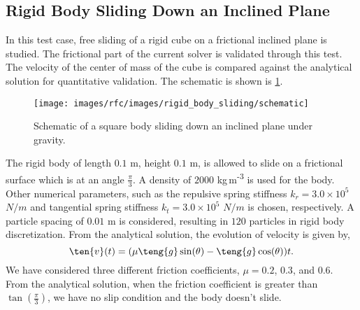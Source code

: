 \FloatBarrier%
\subsection{Rigid Body Sliding Down an Inclined Plane}
\label{sec:rigid-body-sliding}
In this test case, free sliding of a rigid cube on a frictional inclined plane
is studied. The frictional part of the current solver is validated through this
test. The velocity of the center of mass of the cube is compared against the
analytical solution for quantitative validation. The schematic is shown is
\cref{fig:rigid_body_sliding}.
\begin{figure}[!htpb]
  \centering
  \texttt{[image: images/rfc/images/rigid\_body\_sliding/schematic]}
  \caption{Schematic of a square body sliding down an inclined plane under gravity.}
\label{fig:rigid_body_sliding}
\end{figure}
The rigid body of length $0.1$ m, height $0.1$ m, is allowed to slide on a
frictional surface which is at an angle $\frac{\pi}{3}$. A density of $2000$
kg\,m\textsuperscript{-3} is used for the body. Other numerical parameters, such
as the repulsive spring stiffness $k_r=3.0 \times 10^{5}$ $N/m$ and tangential
spring stiffness $k_t=3.0 \times 10^{5}$ $N/m$ is chosen, respectively. A
particle spacing of $0.01$ m is considered, resulting in $120$ particles in
rigid body discretization. From the analytical solution, the evolution of
velocity is given by,
\begin{equation}
  \label{eq:rfc:ce}
  \ten{v}(t) = (\mu \teng{g} \sin (\theta) - \teng{g} \cos (\theta)) t.
\end{equation}
We have considered three different friction coefficients, $\mu=0.2$,
$0.3$, and $0.6$. From the analytical solution, when the friction
coefficient is greater than $\tan(\frac{\pi}{3})$, we have no slip condition
and the body doesn't slide.

